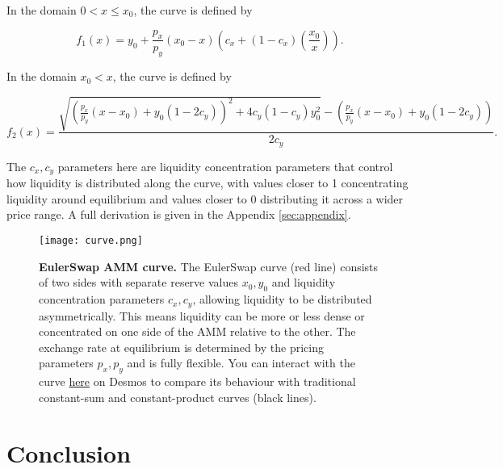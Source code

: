\documentclass{article}
\begin{document}
In the domain $0 < x \leq x_0$, the curve is defined by

\begin{equation}
    \label{eq:fx1-main}
    f_1(x) 
    =
    y_{0}+\frac{p_{x}}{p_{y}}\left(x_{0}-x\right)\left(c_{x}+\left(1-c_{x}\right)\left(\frac{x_{0}}{x}\right)\right).
\end{equation}

In the domain $x_0 < x$, the curve is defined by

\begin{equation}
    \label{eq:fx2-main}
    f_2(x) 
    =
    \frac{
        \sqrt{
            \left( \frac{p_x}{p_y} (x - x_0) + y_0 (1 - 2c_y) \right)^2 
            + 4c_y (1 - c_y) y_0^2
        } 
        - \left( \frac{p_x}{p_y} (x - x_0) + y_0 (1 - 2c_y) \right)
    }{2c_y}.
\end{equation}

 The $c_x, c_y$ parameters here are liquidity concentration parameters that control how liquidity is distributed along the curve, with values closer to 1 concentrating liquidity around equilibrium and values closer to 0 distributing it across a wider price range. A full derivation is given in the Appendix \ref{sec:appendix}.  
 
 \begin{figure}[h]  %
    \centering  %
    \texttt{[image: curve.png]} %
    \caption{\textbf{EulerSwap AMM curve.} The EulerSwap curve (red line) consists of two sides with separate reserve values $x_0, y_0$ and liquidity concentration parameters $c_x, c_y$, allowing liquidity to be distributed asymmetrically. This means liquidity can be more or less dense or concentrated on one side of the AMM relative to the other. The exchange rate at equilibrium is determined by the pricing parameters $p_x, p_y$ and is fully flexible. You can interact with the curve \href{https://www.desmos.com/calculator/gzwmvbs1dk}{here} on Desmos to compare its behaviour with traditional constant-sum and constant-product curves (black lines).}
    \label{fig:fig1}  %
\end{figure}

\section{Conclusion}
\end{document}
